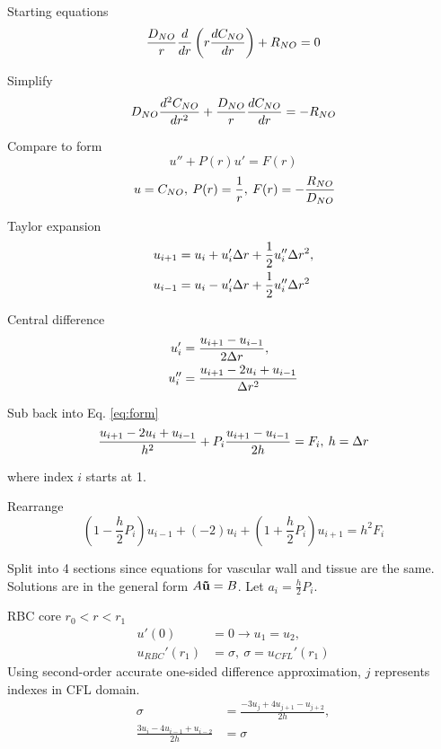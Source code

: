\documentclass[8pt, a4paper]{article}
\begin{document}
  Starting equations
  \begin{equation}
  \frac{D_{NO}}{r} \frac{d}{dr} \left (r \frac{dC_{NO}}{dr} \right) + R_{NO} = 0
  \end{equation}
  
  Simplify
  \begin{equation}
  D_{NO} \frac{d^2C_{NO}}{dr^2} + \frac{D_{NO}}{r} \frac{dC_{NO}}{dr} = - R_{NO}
  \end{equation}
  
  Compare to form
  \begin{equation} \label{eq:form}
  u''+P(r)u'=F(r)
  \end{equation}
  \begin{equation}
  \:u=C_{NO},\:P(r)=\frac{1}{r},\:F(r)=-\frac{R_{NO}}{D_{NO}}
  \end{equation}
  
  Taylor expansion
  \begin{align*}
  u_{i+1}&=u_i+u_i'\Delta r+\frac{1}{2}u_i''\Delta r^2,\\
  u_{i-1}&=u_i-u_i'\Delta r+\frac{1}{2}u_i''\Delta r^2
  \end{align*}
  
  Central difference
  \begin{align*}
  u_i'&=\frac{u_{i+1}-u_{i-1}}{2\Delta r},\\
  u_i''&=\frac{u_{i+1}-2u_i+u_{i-1}}{\Delta r^2}
  \end{align*}
  
  Sub back into Eq. \eqref{eq:form}
  \begin{equation}
  \frac{u_{i+1}-2u_i+u_{i-1}}{h^2}+P_i\frac{u_{i+1}-u_{i-1}}{2h}=F_i,\:h=\Delta r
  \end{equation}
  
  where index $i$ starts at 1. 
  
  Rearrange
  \begin{equation}
  \left (1-\frac{h}{2}P_i \right)u_{i-1}+(-2)u_i+\left (1+\frac{h}{2}P_i 
  \right)u_{i+1}=h^2F_i
  \end{equation}

  Split into 4 sections since equations for vascular wall and tissue are the 
  same. Solutions are in the general form $A\mathbf{\vec{u}}=B$. Let $a_i=\frac{h}{2}P_i$.

  RBC core $r_0 < r < r_1$
  \begin{align*}
  u'(0)&=0\rightarrow u_1 = u_2,\\
  u_{RBC}'(r_1)&=\sigma,\:\sigma=u_{CFL}'(r_1)
  \end{align*}
  Using second-order accurate one-sided difference approximation, $j$ 
  represents indexes in CFL domain.
  \begin{align*}
  \sigma&=\frac{-3u_j+4u_{j+1}-u_{j+2}}{2h},\\
  \frac{3u_i-4u_{i-1}+u_{i-2}}{2h}&=\sigma
  \end{align*}
  
\end{document}
